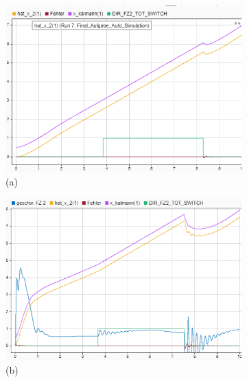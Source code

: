 \begin{figure}[hbt]
\centering
\begin{subfigure}{0.49\textwidth}
    \centering
    \includegraphics*[width=\textwidth]{figures/pid05.png}\\
    (a)
\end{subfigure}
\begin{subfigure}{0.49\textwidth}
    \centering
    \includegraphics*[width=\textwidth]{figures/pidk031000.png}\\
    (b)
\end{subfigure}
\begin{subfigure}{0.49\textwidth}
    \centering

\end{subfigure}
\end{figure}
